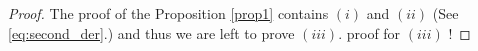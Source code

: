 \documentclass[a4paper,11pt]{article}
\def\red{\color{red}}
\def\tv{{\tilde{v}}}
\def\tth{{\tilde{\theta}}}
\def\ts{{\tilde{\sigma}}}
\def\tu{{\tilde{u}}}
\begin{document}
\begin{proof}
The proof of the Proposition \ref{prop1} contains $(i)$ and $(ii)$ (See \eqref{eq:second_der}.) and thus we are left to prove $(iii)$. {\red proof for $(iii)$ !}

% 
% 
% 
% 
% 
% 
\end{proof}
\end{document}
